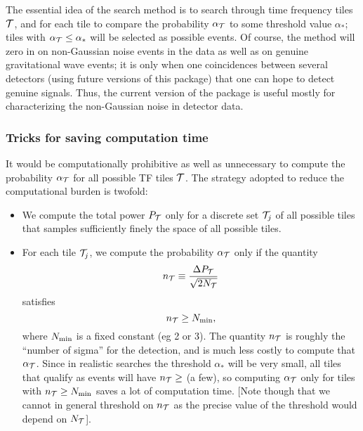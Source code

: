 The essential idea of the search method is to search through time frequency
tiles ${\cal T}$, and for each tile to compare the probability $\alpha_{\cal
T}$ to some threshold value $\alpha_*$; tiles with $\alpha_{\cal T} \le
\alpha_*$ will be selected as possible events.  Of course, the method will
zero in on non-Gaussian noise events in the data as well as on genuine
gravitational wave events; it is only when one coincidences between several
detectors (using future versions of this package) that one can hope to
detect genuine signals.  Thus, the current version of the package is useful
mostly for characterizing the non-Gaussian noise in detector data.

\subsubsection{Tricks for saving computation time}

It would be computationally prohibitive as well as unnecessary to compute
the probability $\alpha_{\cal T}$ for all possible TF tiles ${\cal
T}$.  The strategy adopted to reduce the computational burden is
twofold:  
\begin{itemize}
\item We compute the total power $P_{\cal T}$ only for a discrete set
${\cal T}_j$ of all possible tiles that samples sufficiently finely
the space of all possible tiles.
\item For each tile ${\cal T}_j$, we compute the probability
$\alpha_{\cal T}$ only if the quantity
\begin{equation}
n_{\cal T} \equiv {\Delta P_{\cal T} \over \sqrt{2 N_{\cal T}}}
\label{nsigma}
\end{equation}
satisfies 
\begin{equation}
n_{\cal T} \ge N_{\rm min},
\label{firstcut}
\end{equation}
where $N_{\rm min}$ is a fixed constant (eg 2 or 3).  The quantity $n_{\cal
T}$ is roughly the ``number of sigma'' for the detection, and is much less
costly to compute that $\alpha_{\cal T}$.  Since in realistic searches the
threshold $\alpha_*$ will be very small, all tiles that qualify as events
will have $n_{\cal T} \ge$ (a few), so computing $\alpha_{\cal T}$ only for
tiles with $n_{\cal T} \ge N_{\rm min}$ saves a lot of computation time.
[Note though that we cannot in general threshold on $n_{\cal T}$ as the
precise value of the threshold would depend on $N_{\cal T}$].
\end{itemize}

